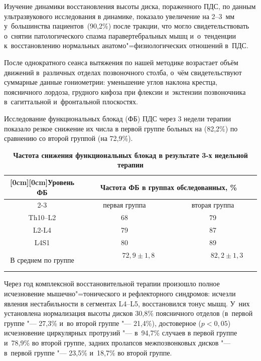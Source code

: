 Изучение динамики восстановления высоты диска, пораженного ПДС, по данным
ультразвукового исследования в динамике, показало увеличение на 2--3~мм
у~большинства пациентов~(90,2{\%}) после тракции, что могло свидетельствовать
о~снятии патологического спазма паравертебральных мышц и~о~тенденции
к~восстановлению нормальных анатомо"=физиологических отношений в~ПДС.

После однократного сеанса вытяжения по нашей методике возрастает объём
движений в~различных отделах позвоночного столба, о~чём свидетельствуют
суммарные данные гониометрии: уменьшение углов наклона крестца, поясничного
лордоза, грудного кифоза при флексии и~экстензии позвоночника в~сагиттальной
и~фронтальной плоскостях.

Исследование функциональных блокад (ФБ) ПДС через 3 недели терапии показало
резкое снижение их числа в первой группе больных на (82,2{\%}) по сравнению со второй группой (на 72,9{\%}).


\begin{table}[t!]
\centering
\begin{minipage}{.9\textwidth}

\footnotesize
\centering
\caption{\bf Частота снижения функциональных блокад в результате  3-х недельной
терапии} \vspace{-3mm}
\begin{tabular}{c|c|c}
\hline
\raisebox{-1.50ex}[0cm][0cm]{Уровень ФБ}&
\multicolumn{2}{|c}{Частота ФБ в группах обследованных, {\%}}  \\
\cline{2-3}
 &
первая группа&
вторая группа \\
\hline
Th10--L2&
68&
79 \\
L2-L4&
79&
87 \\
L4S1&
80&
89 \\
\hline
В среднем по группе&
~~~~~~~~$72,9\pm 1,8$~~~~~~~~&
~~~~~~~~$82,2\pm 1,3$~~~~~~~~ \\
\hline
\end{tabular}
\end{minipage}
\end{table}

Через год комплексной восстановительной терапии произошло полное
исчезновение мышечно"=тонического и рефлекторного синдромов: исчезли явления
нестабильности в сегментах L4--L5, восстановился тонус мышц.
У~них установлена нормализация высоты дисков 30,8{\%} поясничного отделов (в~первой группе "--- 27,3{\%} и~во второй группе "--- 21,4{\%}),
достоверное ($p< 0,05$) исчезновение циркулярных протрузий "--- в~94,7{\%} случаев в первой группе и~78,9{\%} во
второй группе, задних пролапсов межпозвонковых дисков "---  в~первой группе "--- 23,5{\%} и~18,7{\%}
во второй группе.

